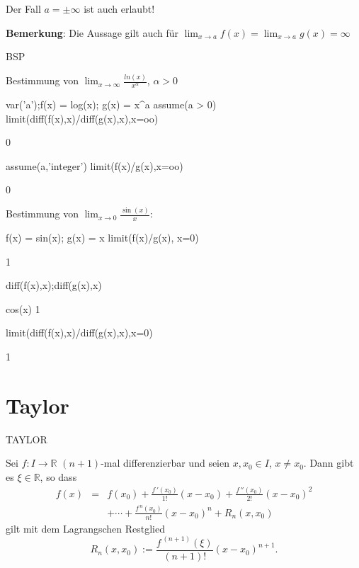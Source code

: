 \documentclass[fontsize=12pt,paper=a4,twoside,bibtotoc,idxtotoc,
liststotoc,pagesize,BCOR1.2cm,DIV15,chapterprefix,pagesize=pdftex]{scrbook}
\theoremstyle{plain}
\theoremstyle{definition}
\theoremstyle{remark}
\begin{document}
Der Fall $a=\pm\infty$ ist auch erlaubt!

\textbf{Bemerkung}: Die Aussage gilt auch für $\lim_{x \rightarrow a} f(x)=\lim_{x \rightarrow a} g(x)= \infty$ 

BSP


 Bestimmung von $ \lim_{x \rightarrow \infty} \frac{ln(x)}{x^\alpha}$, $\alpha >0$
\begin{sagein}
var('a');f(x) = log(x); g(x) = x^a
assume(a > 0)
limit(diff(f(x),x)/diff(g(x),x),x=oo)
\end{sagein}
\begin{sage}
  0
\end{sage}
\begin{sagein}
assume(a,'integer')
limit(f(x)/g(x),x=oo)
\end{sagein}
\begin{sage}
  0
\end{sage}
 Bestimmung von $\lim_{x \rightarrow 0} \frac{\sin(x)}{x}$:
\begin{sagein}
f(x) = sin(x); g(x) = x 
limit(f(x)/g(x), x=0)
\end{sagein}
\begin{sage}
  1
\end{sage}
\begin{sagein}
diff(f(x),x);diff(g(x),x)
\end{sagein}
\begin{sage}
cos(x) 
1
\end{sage}
\begin{sagein}
limit(diff(f(x),x)/diff(g(x),x),x=0)
\end{sagein}
\begin{sage}
1
\end{sage}


\section{Taylor}

TAYLOR

Sei $f:I \rightarrow \mathbb{R}$ $(n+1)$-mal differenzierbar und seien
$x,x_0 \in I$, $x \neq x_0$. Dann gibt es $\xi \in \mathbb{R}$, so
dass
\begin{eqnarray*}
f(x)& = & f(x_0) + \frac{f\,'(x_0)}{1!}(x-x_0)+
\frac{f\,''(x_0)}{2!}(x-x_0)^2\\[0.5cm]
 & & + \cdots + \frac{f^{\,n}(x_0)}{n!}(x-x_0)^n +R_n(x,x_0) 
\end{eqnarray*}
gilt mit dem  {\color{red} Lagrangschen Restglied}
\[ R_n(x,x_0) := \frac{f^{\,(n+1)}(\xi)}{(n+1)!} (x-x_0)^{n+1}. \]
\end{document}
